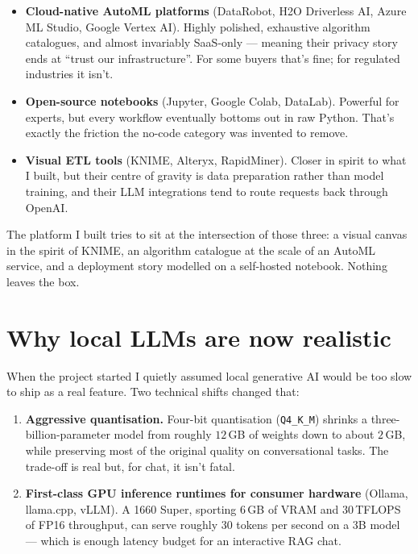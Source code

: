 \documentclass[12pt, a4paper]{report}
\begin{document}
\begin{itemize}
    \item \textbf{Cloud-native AutoML platforms} (DataRobot, H2O
        Driverless AI, Azure ML Studio, Google Vertex AI). Highly
        polished, exhaustive algorithm catalogues, and almost
        invariably SaaS-only --- meaning their privacy story ends at
        ``trust our infrastructure''. For some buyers that's fine; for
        regulated industries it isn't.
    \item \textbf{Open-source notebooks} (Jupyter, Google Colab,
        DataLab). Powerful for experts, but every workflow eventually
        bottoms out in raw Python. That's exactly the friction the
        no-code category was invented to remove.
    \item \textbf{Visual ETL tools} (KNIME, Alteryx, RapidMiner).
        Closer in spirit to what I built, but their centre of gravity
        is data preparation rather than model training, and their LLM
        integrations tend to route requests back through OpenAI.
\end{itemize}

The platform I built tries to sit at the intersection of those three: a
visual canvas in the spirit of KNIME, an algorithm catalogue at the
scale of an AutoML service, and a deployment story modelled on a
self-hosted notebook. Nothing leaves the box.

\section{Why local LLMs are now realistic}

When the project started I quietly assumed local generative AI would be
too slow to ship as a real feature. Two technical shifts changed that:

\begin{enumerate}
    \item \textbf{Aggressive quantisation.} Four-bit quantisation
        (\texttt{Q4\_K\_M}) shrinks a three-billion-parameter model
        from roughly $12$\,GB of weights down to about $2$\,GB, while
        preserving most of the original quality on conversational
        tasks. The trade-off is real but, for chat, it isn't fatal.
    \item \textbf{First-class GPU inference runtimes for consumer
        hardware} (Ollama, llama.cpp, vLLM). A 1660 Super, sporting
        $6$\,GB of VRAM and $30$\,TFLOPS of FP16 throughput, can serve
        roughly $30$ tokens per second on a 3B model --- which is
        enough latency budget for an interactive RAG chat.
\end{enumerate}
\end{document}
